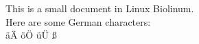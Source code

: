 \documentclass{article}
\begin{document}
This is a small document in Linux Biolinum.
\\
Here are some German characters:
\\
äÄ öÖ üÜ ß
\end{document}
